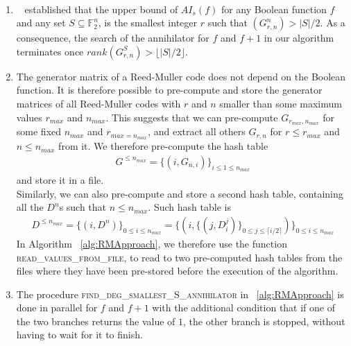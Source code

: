 \documentclass[11pt]{llncs}
\begin{document}
\begin{remark}~\label{rem:remarksOnAlg}
	\begin{enumerate}
		\item ~\cite{TOSC:CarMeaRot17} established that the upper bound of $AI_s(f)$ for any Boolean function $f$ and any set $S\subseteq \mathbb{F}_2^n$, is the smallest integer $r$ such that $\left(G_{r,n}^n\right) > |S| / 2$. As a consequence, the search of the annihilator for $f$ and $f+ 1$ in our algorithm terminates once $rank\left(G_{r,n}^S\right) > \lfloor{|S| / 2}\rfloor$.\label{item:Item1RemOnAlg}
		\item The generator matrix of a Reed-Muller code does not depend on the Boolean function. It is therefore possible to pre-compute and store the generator matrices of all Reed-Muller codes with $r$ and $n$ smaller than some maximum values $r_{max}$ and $n_{max}$.
		This suggests that we can pre-compute $G_{r_{max}, n_{max}}$ for some fixed $n_{max}$ and $r_{max = n_{max}}$, and extract all others $G_{r,n}$ for $r \leq r_{max}$ and $n \leq n_{max}$ from it.
		We therefore pre-compute the hash table
		\begin{align*}
		G^{\leq n_{max}} = \{\left(i, G_{n,i}\right)\}_{i \leq 1 \leq n_{max}}
		\end{align*}
		and store it in a file.\\
		Similarly, we can also pre-compute and store a second hash table, containing all the $D^n$s such that $n \leq n_{max}$. Such hash table is
		\begin{align}\label{eq:degreesHashTable}
		D^{\leq n_{max}} =  \{\left(i,D^{n} \right)\}_{0 \leq i \leq n_{max}} =  \{\left(i, \{ \left(j, D_i^j\right)\}_{0\leq j \leq \lceil{i/2}\rceil} \right)\}_{0 \leq i \leq n_{max}}
		\end{align}
		In Algorithm ~\ref{alg:RMApproach}, we therefore use the function \textsc{read\_values\_from\_file}, to read to two pre-computed hash tables from the files where they have been pre-stored before the execution of the algorithm.
		\item The procedure \textsc{find\_deg\_smallest\_S\_annihilator} in ~\ref{alg:RMApproach} is done in parallel for $f$ and $f+ 1$ with the additional condition that if one of the two branches returns the value of $1$, the other branch is stopped, without having to wait for it to finish.
	\end{enumerate}	
\end{remark}
\end{document}
